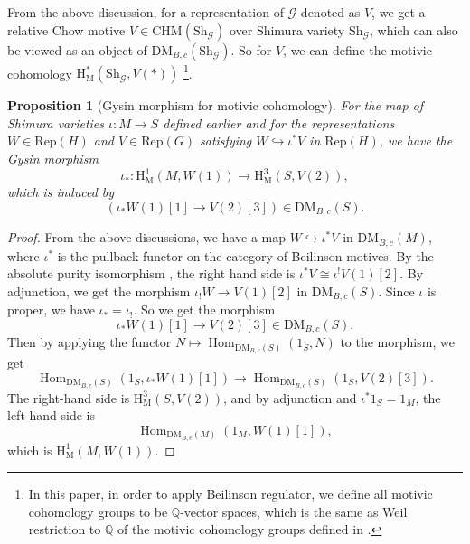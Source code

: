 \documentclass[11pt, a4paper]{amsart}
\theoremstyle{plain}
\newtheorem{proposition}[theorem]{Proposition}
\theoremstyle{definition}
\numberwithin{equation}{section}
\def\calG{\mathcal{G}}
\def\QQ{\mathbb{Q}}
\DeclareMathOperator{\Hom}{Hom}
\newcommand{\Sh}{\mathrm{Sh}}
\begin{document}
\par From the above discussion, for a representation of $\calG$ denoted as $V$, we get a relative Chow motive $V \in \mathrm{CHM}(\Sh_{\calG})$ over Shimura variety $\Sh_{\calG}$, which can also be viewed as an object of $\mathrm{DM}_{B,c}(\Sh_{\calG})$. So for $V$, we can define the motivic cohomology $\mathrm{H}_{\mathrm{M}}^{*}(\Sh_{\calG}, V(*))$ \footnote{In this paper, in order to apply Beilinson regulator, we define all motivic cohomology groups to be $\QQ$-vector spaces, which is the same as Weil restriction to $\QQ$ of the motivic cohomology groups defined in \cite{LSZ22}.}.
 
 \begin{proposition}[Gysin morphism for motivic cohomology]
 \label{Prop: Gysin for motivic cohomology}
For the map of Shimura varieties $\iota \colon M \rightarrow S$ defined earlier and for the representations $W \in \mathrm{Rep}(H)$ and $V \in \mathrm{Rep}(G)$ satisfying $W \hookrightarrow \iota^{*}V$ in $\mathrm{Rep}(H)$, we have the Gysin morphism 
\[
    \iota_{*} \colon \mathrm{H}^{1}_{\mathrm{M}}(M, W(1)) \rightarrow \mathrm{H}^{3}_{\mathrm{M}}(S, V(2)), 
\]
which is induced by 
\begin{equation}
\label{eq: Gysin morphism in DM}
    (\iota_{*}W(1)[1] \rightarrow V(2)[3]) \in \mathrm{DM}_{B,c}(S). 
\end{equation}
\end{proposition}
\begin{proof}
 From the above discussions, we have a map $W \hookrightarrow \iota^{*}V$ in $\mathrm{DM}_{B,c}(M)$, where $\iota^{*}$ is the pullback functor on the category of Beilinson motives. By the absolute purity isomorphism \cite[Proposition 1.7]{PL15}, the right hand side is $\iota^{*}V \cong \iota^{!}V(1)[2]$. By adjunction, we get the morphism $\iota_{!}W \rightarrow V(1)[2]$ in $\mathrm{DM}_{B,c}(S)$. Since $\iota$ is proper, we have $\iota_{*} = \iota_{!}$. So we get the morphism 
 \begin{equation*}
    \iota_{*}W(1)[1] \rightarrow V(2)[3] \in \mathrm{DM}_{B,c}(S). 
 \end{equation*}
 Then by applying the functor $N \longmapsto \Hom_{\mathrm{DM}_{B,c}(S)}(1_{S}, N)$ to the morphism, we get 
\[
\Hom_{\mathrm{DM}_{B,c}(S)}(1_{S}, \iota_{*}W(1)[1]) \rightarrow \Hom_{\mathrm{DM}_{B,c}(S)}(1_{S}, V(2)[3]). 
\]
The right-hand side is $\mathrm{H}^{3}_{\mathrm{M}}(S, V(2))$, and by adjunction and $\iota^{*} 1_{S} = 1_{M}$, the left-hand side is 
\begin{equation*}
    \Hom_{\mathrm{DM}_{B,c}(M)}(1_{M}, W(1)[1]), 
\end{equation*} which is $\mathrm{H}^{1}_{\mathrm{M}}(M, W(1))$. 
\end{proof}
\end{document}
